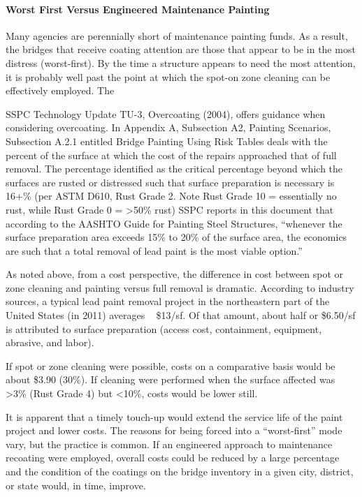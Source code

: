 \paragraph{Worst First Versus Engineered Maintenance Painting}

Many agencies are perennially short of maintenance painting funds. As a result, the bridges that receive coating
attention are those that appear to be in the most distress (worst-first). By the time a structure appears to need the
most attention, it is probably well past the point at which the spot-on zone cleaning can be effectively employed. The

SSPC Technology Update TU-3, Overcoating (2004), offers guidance when considering overcoating. In Appendix
A, Subsection A2, Painting Scenarios, Subsection A.2.1 entitled Bridge Painting Using Risk Tables deals with the
percent of the surface at which the cost of the repairs approached that of full removal. The percentage identified as
the critical percentage beyond which the surfaces are rusted or distressed such that surface preparation is necessary is
16+\% (per ASTM D610, Rust Grade 2. Note Rust Grade 10 = essentially no rust, while Rust Grade 0 = >50\% rust)
SSPC reports in this document that according to the AASHTO Guide for Painting Steel Structures, \cite{aashto1994g} ``whenever the surface preparation area exceeds 15\% to 20\% of the surface area, the economics are such that a
total removal of lead paint is the most viable option.''

As noted above, from a cost perspective, the difference in cost between spot or zone cleaning and painting versus
full removal is dramatic. According to industry sources, a typical lead paint removal project in the northeastern part
of the United States (in 2011) averages ~ \$13/sf. Of that amount, about half or \$6.50/sf is attributed to surface
preparation (access cost, containment, equipment, abrasive, and labor).

If spot or zone cleaning were possible, costs on a comparative basis would be about \$3.90 (30\%). If cleaning
were performed when the surface affected was >3\% (Rust Grade 4) but <10\%, costs would be lower still.

It is apparent that a timely touch-up would extend the service life of the paint project and lower costs. The
reasons for being forced into a “worst-first” mode vary, but the practice is common. If an engineered approach to
maintenance recoating were employed, overall costs could be reduced by a large percentage and the condition of the
coatings on the bridge inventory in a given city, district, or state would, in time, improve.

